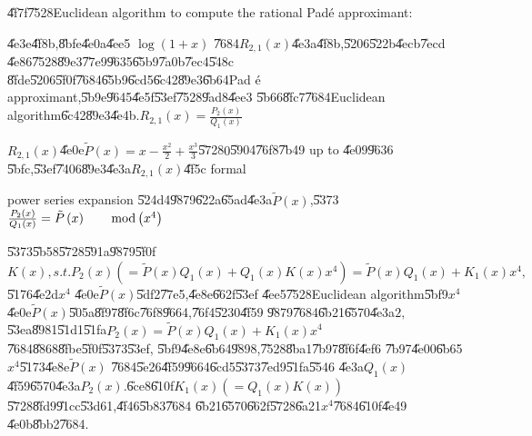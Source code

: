 \documentclass{article}
\begin{document}
\U{4f7f}\U{7528}Euclidean algorithm to compute the rational Pad\'{e}
approximant:

\U{4e3e}\U{4f8b},\U{8bfe}\U{4e0a}\U{4ee5} $\log \left( 1+x\right) $ \U{7684}$%
R_{2,1}\left( x\right) $\U{4e3a}\U{4f8b},\U{5206}\U{522b}\U{4ecb}\U{7ecd}%
\U{4e86}\U{7528}\U{89e3}\U{77e9}\U{9635}\U{65b9}\U{7a0b}\U{7ec4}\U{548c}%
\U{8fde}\U{5206}\U{5f0f}\U{7684}\U{65b9}\U{6cd5}\U{6c42}\U{89e3}\U{6b64}Pad%
\'{e} approximant,\U{5b9e}\U{9645}\U{4e5f}\U{53ef}\U{7528}\U{9ad8}\U{4ee3}%
\U{5b66}\U{8fc7}\U{7684}Euclidean algorithm\U{6c42}\U{89e3}\U{4e4b}.$%
R_{2,1}\left( x\right) =\frac{P_{2}\left( x\right) }{Q_{1}\left( x\right) }$

$R_{2,1}\left( x\right) $\U{4e0e}$\tilde{P}\left( x\right) =x-\frac{x^{2}}{2}%
+\frac{x^{3}}{3}$\U{5728}$0$\U{5904}\U{76f8}\U{7b49} up to \U{4e09}\U{9636}%
\U{5bfc},\U{53ef}\U{7406}\U{89e3}\U{4e3a}$R_{2,1}\left( x\right) $\U{4f5c}
formal

power series expansion \U{524d}4\U{9879}\U{622a}\U{65ad}\U{4e3a}$\tilde{P}%
\left( x\right) $,\U{5373}$\frac{P_{2}\left( x\right) }{Q_{1}\left( x\right) 
}=\tilde{P}\left( x\right) \qquad \mathop{\rm mod}\left( x^{4}\right) $

\U{5373}\U{5b58}\U{5728}\U{591a}\U{9879}\U{5f0f}$K\left( x\right)
,s.t.P_{2}\left( x\right) (=\tilde{P}\left( x\right) Q_{1}\left( x\right)
+Q_{1}\left( x\right) K\left( x\right) x^{4})=\tilde{P}\left( x\right)
Q_{1}\left( x\right) +K_{1}\left( x\right) x^{4},$\U{5176}\U{4e2d}$x^{4}$%
\U{4e0e}$\tilde{P}\left( x\right) $\U{5df2}\U{77e5},\U{4e8e}\U{662f}\U{53ef}%
\U{4ee5}\U{7528}Euclidean algorithm\U{5bf9}$x^{4}$\U{4e0e}$\tilde{P}\left(
x\right) $\U{505a}\U{8f97}\U{8f6c}\U{76f8}\U{9664},\U{76f4}\U{5230}\U{4f59}%
\U{9879}\U{7684}\U{6b21}\U{6570}\U{4e3a}$2,$\U{53ea}\U{8981}\U{51d1}\U{51fa}$%
P_{2}\left( x\right) =\tilde{P}\left( x\right) Q_{1}\left( x\right)
+K_{1}\left( x\right) x^{4}$\U{7684}\U{8868}\U{8fbe}\U{5f0f}\U{5373}\U{53ef},%
\U{5bf9}\U{4e8e}\U{6b64}\U{9898},\U{7528}\U{8ba1}\U{7b97}\U{8f6f}\U{4ef6}%
\U{7b97}\U{4e00}\U{6b65}$x^{4}$\U{5173}\U{4e8e}$\tilde{P}\left( x\right) $%
\U{7684}\U{5e26}\U{4f59}\U{9664}\U{6cd5}\U{5373}\U{7ed9}\U{51fa}\U{5546}%
\U{4e3a}$Q_{1}\left( x\right) $\U{4f59}\U{6570}\U{4e3a}$P_{2}\left( x\right)
.$\U{6ce8}\U{610f}$K_{1}\left( x\right) \left( =Q_{1}\left( x\right) K\left(
x\right) \right) $\U{5728}\U{8fd9}\U{91cc}\U{53d6}1,\U{4f46}\U{5b83}\U{7684}%
\U{6b21}\U{6570}\U{662f}\U{5728}\U{6a21}$x^{4}$\U{7684}\U{610f}\U{4e49}%
\U{4e0b}\U{8bb2}\U{7684}.
\end{document}

